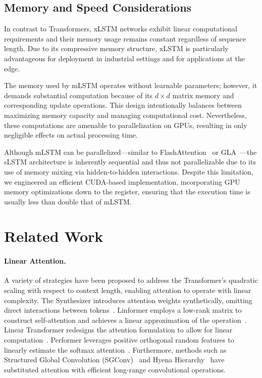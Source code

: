 \subsection{Memory and Speed Considerations}

In contrast to Transformers, xLSTM networks exhibit linear computational requirements and their memory usage remains constant regardless of sequence length. Due to its compressive memory structure, xLSTM is particularly advantageous for deployment in industrial settings and for applications at the edge.

The memory used by mLSTM operates without learnable parameters; however, it demands substantial computation because of its $d \times d$ matrix memory and corresponding update operations. This design intentionally balances between maximizing memory capacity and managing computational cost. Nevertheless, these computations are amenable to parallelization on GPUs, resulting in only negligible effects on actual processing time.

Although mLSTM can be parallelized—similar to FlashAttention~\citep{Dao:22,Dao:23} or GLA~\citep{Yang:23arxiv}—the sLSTM architecture is inherently sequential and thus not parallelizable due to its use of memory mixing via hidden-to-hidden interactions. Despite this limitation, we engineered an efficient CUDA-based implementation, incorporating GPU memory optimizations down to the register, ensuring that the execution time is usually less than double that of mLSTM.

\section{Related Work}
\label{sec:related}

\paragraph{Linear Attention.} A variety of strategies have been proposed to address the Transformer’s quadratic scaling with respect to context length, enabling attention to operate with linear complexity. The Synthesizer introduces attention weights synthetically, omitting direct interactions between tokens~\citep{Tay:20arxiv}. Linformer employs a low-rank matrix to construct self-attention and achieves a linear approximation of the operation~\citep{Wang:20arxiv}. Linear Transformer redesigns the attention formulation to allow for linear computation~\citep{Katharopoulos:20}. Performer leverages positive orthogonal random features to linearly estimate the softmax attention~\citep{Choromanski:21}. Furthermore, methods such as Structured Global Convolution (SGConv)~\citep{Li:22} and Hyena Hierarchy~\citep{Poli:23} have substituted attention with efficient long-range convolutional operations.


